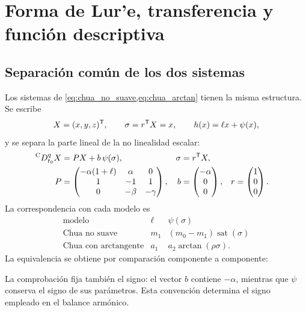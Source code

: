 \section{Forma de Lur'e, transferencia y función descriptiva}
\label{sec:lure_transferencia}

\HAFOCardLure

\subsection{Separación común de los dos sistemas}

Los sistemas de \cref{eq:chua_no_suave,eq:chua_arctan} tienen la misma
estructura. Se escribe
\[
X=(x,y,z)^{\mathsf T},\qquad
\sigma=r^{\mathsf T}X=x,\qquad
h(x)=\ell x+\psi(x),
\]
y se separa la parte lineal de la no linealidad escalar:
\begin{equation}
\begin{aligned}
{}^{\mathrm C}D_{t_0}^{q}X
&=PX+b\,\psi(\sigma),&
\sigma&=r^{\mathsf T}X,\\
P&=
\begin{pmatrix}
-\alpha(1+\ell)&\alpha&0\\
1&-1&1\\
0&-\beta&-\gamma
\end{pmatrix},&
b&=
\begin{pmatrix}
-\alpha\\0\\0
\end{pmatrix},&
r&=
\begin{pmatrix}
1\\0\\0
\end{pmatrix}.
\end{aligned}
\label{eq:lure_comun}
\end{equation}
La correspondencia con cada modelo es
\begin{equation}
\begin{array}{c|c|c}
\text{modelo}&\ell&\psi(\sigma)\\ \hline
\text{Chua no suave}
&m_1&(m_0-m_1)\operatorname{sat}(\sigma)\\[1mm]
\text{Chua con arctangente}
&a_1&a_2\arctan(\rho\sigma).
\end{array}
\label{eq:correspondencia_lure}
\end{equation}
La equivalencia se obtiene por comparación componente a componente:
\begingroup
\def\HAFOderivationpart{1}

\endgroup
La comprobación fija también el signo: el vector \(b\) contiene \(-\alpha\), mientras que
\(\psi\) conserva el signo de sus parámetros. Esta convención determina el
signo empleado en el balance armónico.

